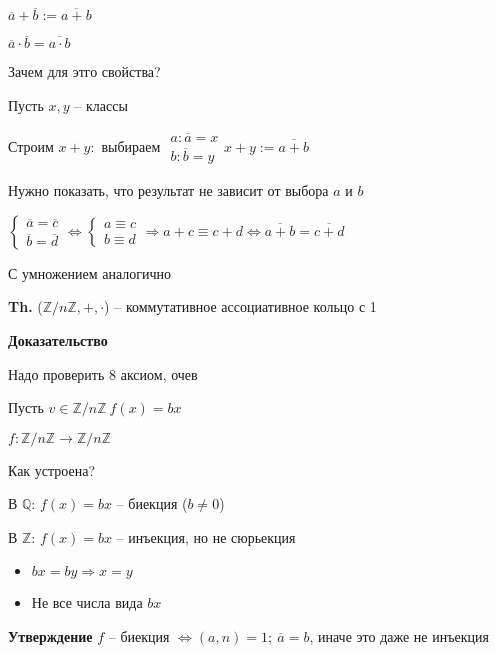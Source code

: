 \documentclass[14pt, letter paper]{article}
\begin{document}
$\overline{a} + \overline{b} := \overline{a + b}$

$\overline{a} \cdot \overline{b} = \overline{a \cdot b}$

Зачем для этго свойства?

Пусть $x, y$ -- классы

Строим $x + y:$ выбираем $\begin{gathered}
    a : \overline{a} = x \\
    b : \overline{b} = y
\end{gathered} x + y := \overline{a + b}$

Нужно показать, что результат не зависит от выбора $a$ и $b$

$\begin{cases}
    \overline{a} = \overline{c} \\
    \overline{b} = \overline{d}
\end{cases} \Leftrightarrow \begin{cases}
    a \equiv c \\
    b \equiv d
\end{cases} \Rightarrow a + c \equiv c + d \Leftrightarrow \overline{a + b} = \overline{c + d}$

С умножением аналогично

\textbf{Th.} ($\mathds{Z}/n\mathds{Z}, +, \cdot$) -- коммутативное ассоциативное кольцо с 1

\begin{center}
    \textbf{Доказательство}
\end{center}

Надо проверить 8 аксиом, очев

\vspace{5mm}

Пусть $v \in \mathds{Z}/n\mathds{Z}\ f(x) = bx$

$f : \mathds{Z}/n\mathds{Z} \rightarrow \mathds{Z}/n\mathds{Z}$

Как устроена?

В $\mathds{Q}$: $f(x) = bx$ -- биекция ($b \neq 0$)

В $\mathds{Z}$: $f(x) = bx$ -- инъекция, но не сюрьекция

\begin{itemize}
    \item $bx = by \Rightarrow x = y$
    \item Не все числа вида $bx$
\end{itemize}

\textbf{Утверждение} $f$ -- биекция $\Leftrightarrow (a, n) = 1;\ \overline{a} = b$, иначе это даже не инъекция
\end{document}
